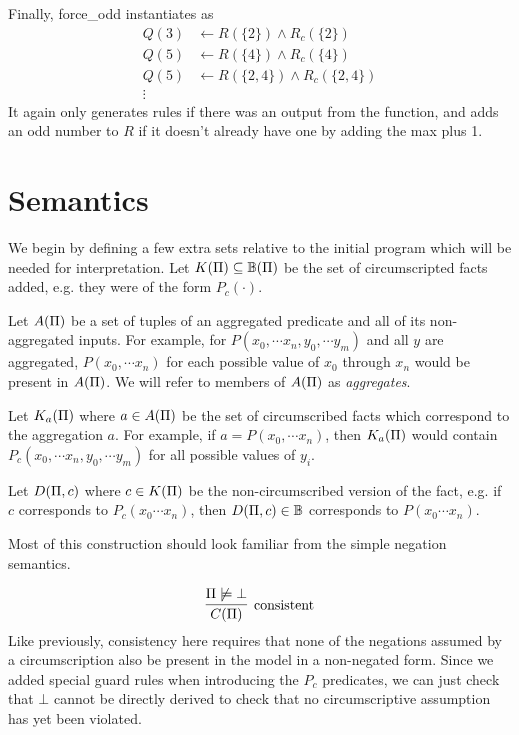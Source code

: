 Finally, force\_odd instantiates as
\begin{align*}
	Q(3) &\leftarrow R(\{2\}) \wedge R_c(\{2\})\\
	Q(5) &\leftarrow R(\{4\}) \wedge R_c(\{4\})\\
	Q(5) &\leftarrow R(\{2, 4\}) \wedge R_c(\{2, 4\})\\
	\vdots
\end{align*}
It again only generates rules if there was an output from the function, and adds an odd number to $R$ if it doesn't already have one by adding the max plus 1.

\section{Semantics}
\label{formal:sec:semantics}
We begin by defining a few extra sets relative to the initial program which will be needed for interpretation.
Let $K(\Pi) \subseteq \mathbb{B}(\Pi)$ be the set of circumscripted facts added, e.g. they were of the form $P_c(\cdot)$.

Let $A(\Pi)$ be a set of tuples of an aggregated predicate and all of its non-aggregated inputs.
For example, for $P(x_0, \cdots x_n, y_0, \cdots y_m)$ and all $y$ are aggregated, $P(x_0, \cdots x_n)$ for each possible value of $x_0$ through $x_n$ would be present in $A(\Pi)$.
We will refer to members of $A(\Pi)$ as \emph{aggregates}.

Let $K_a(\Pi)$ where $a \in A(\Pi)$ be the set of circumscribed facts which correspond to the aggregation $a$.
For example, if $a = P(x_0, \cdots x_n)$, then $K_a(\Pi)$ would contain $P_c(x_0, \cdots x_n, y_0, \cdots y_m)$ for all possible values of $y_i$.

Let $D(\Pi, c)$ where $c \in K(\Pi)$ be the non-circumscribed version of the fact, e.g. if $c$ corresponds to $P_c(x_0 \cdots x_n)$, then $D(\Pi, c) \in \mathbb{B}$ corresponds to $P(x_0 \cdots x_n)$.

Most of this construction should look familiar from the simple negation semantics.

\[
	\infer[\textrm{consistent}]{\cons{\Pi}}{\Pi \not \models \bot}
\]
Like previously, consistency here requires that none of the negations assumed by a circumscription also be present in the model in a non-negated form.
Since we added special guard rules when introducing the $P_c$ predicates, we can just check that $\bot$ cannot be directly derived to check that no circumscriptive assumption has yet been violated.


